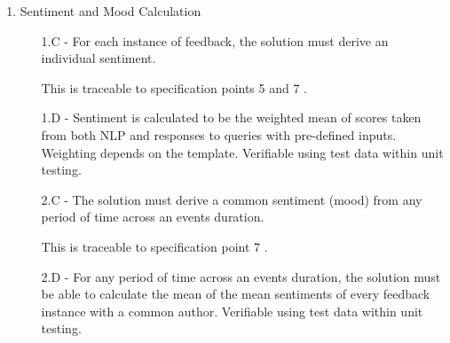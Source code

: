 \documentclass[9pt, titlepage]{extarticle}
\begin{document}
\begin{enumerate}[leftmargin=*]
\item Sentiment and Mood Calculation
\begin{enumerate}[noitemsep, topsep=0pt, leftmargin=9mm]
\item[1.C -] For each instance of feedback, the solution must derive an individual sentiment. 
\item[] This is traceable to specification points 5 and 7 \autocite{web:spec}.
\item[1.D -] Sentiment is calculated to be the weighted mean of scores taken from both NLP and responses to queries with pre-defined inputs. Weighting depends on the template. Verifiable using test data within unit testing.
\item[2.C -] The solution must derive a common sentiment (mood) from any period of time across an events duration. 
\item[] This is traceable to specification point 7 \autocite{web:spec}.
\vspace*{1mm} 
\item[2.D -] For any period of time across an events duration, the solution must be able to calculate the mean of the mean sentiments of every feedback instance with a common author. Verifiable using test data within unit testing.
\end{enumerate}


\end{enumerate}
\end{document}
